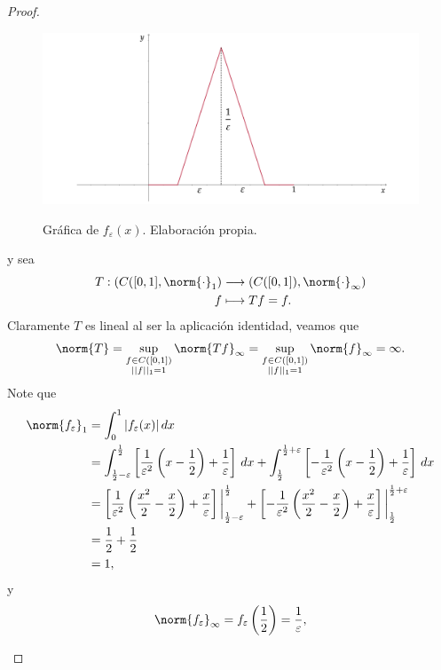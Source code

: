 \begin{proof}
\begin{enumerate}
\begin{figure}[H]
    \centering
    \includegraphics[scale=0.3]{Chapters/funcional1.png}\\
    \caption{Gráfica de $f_\varepsilon(x)$. Elaboración propia.}
    \end{figure}
    y sea
    \begin{align*}
        T:(C([0,1],\norm{\cdot}_1)&\longrightarrow (C([0,1]),\norm{\cdot}_\infty)\\
        f &\longmapsto Tf=f.
    \end{align*}
    Claramente $T$ es lineal al ser la aplicación identidad, veamos que
    \begin{align*}
        \norm{T}=\sup_{\substack{f\in C([0,1])\\||f||_1= 1}}\norm{Tf}_\infty=\sup_{\substack{f\in C([0,1])\\||f||_1= 1}}\norm{f}_\infty=\infty.
    \end{align*}
    Note que 
    \begin{align*}
        \norm{f_\varepsilon}_1&=\int_0^1 |f_\varepsilon(x)|\, dx\\
        &=\int_{\frac{1}{2}-\varepsilon}^{\frac{1}{2}}\left[\frac{1}{\varepsilon^2}\left(x-\frac{1}{2}\right)+\frac{1}{\varepsilon}\right]\, dx+\int_{\frac{1}{2}}^{\frac{1}{2}+\varepsilon}\left[-\frac{1}{\varepsilon^2}\left(x-\frac{1}{2}\right)+\frac{1}{\varepsilon}\right]\, dx\\
        &=\left[\frac{1}{\varepsilon^2}\left(\frac{x^2}{2}-\frac{x}{2}\right)+\frac{x}{\varepsilon}\right]\bigg|_{\frac{1}{2}-\varepsilon}^{\frac{1}{2}}+\left[-\frac{1}{\varepsilon^2}\left(\frac{x^2}{2}-\frac{x}{2}\right)+\frac{x}{\varepsilon}\right]\bigg|_{\frac{1}{2}}^{\frac{1}{2}+\varepsilon}\\
        &=\frac{1}{2}+\frac{1}{2}\\
        &=1,
    \end{align*}
    y
    \begin{align*}
        \norm{f_\varepsilon}_\infty=f_\varepsilon\left(\frac{1}{2}\right)=\frac{1}{\varepsilon},

\end{align*}
\end{enumerate}
\end{proof}
